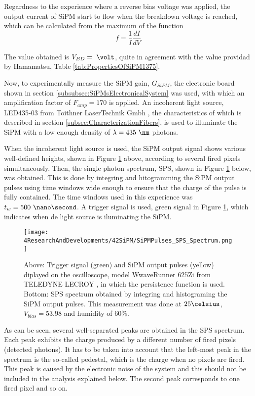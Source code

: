 Regardness to the experience where a reverse bias voltage was applied, the output current of SiPM start to flow when the breakdown voltage is reached, which can be calculated from the maximum of the function 
\begin{equation}
f=\frac{1}{I}\frac{dI}{dV}
\label{BreakDownVoltageFunction}
\end{equation}

The value obtained is $V_{BD}=~\volt$, quite in agreement with the value providad by Hamamatsu, Table \ref{tab:PropertiesOfSiPM1375}.

Now, to experimentally measure the SiPM gain, $G_{SiPM}$, the electronic board shown in section \ref{subsubsec:SiPMsElectronicalSystem} was used, with which an amplification factor of $F_{amp}=170$ is applied. An incoherent light source, LED435-03 from Toithner LaserTechnik Gmbh \cite{LEDRLT}, the characteristics of which is described in section \ref{subsec:CharacterizationFibers}, is used to illuminate the SiPM with a low enough density of $\lambda= 435~\nm$ photons.

When the incoherent light source is used, the SiPM output signal shows various well-defined heights, shown in Figure \ref{fig:OutputPulses_SPSspectrum} above, according to several fired pixels simultaneously. Then, the single photon spectrum, SPS, shown in Figure \ref{fig:OutputPulses_SPSspectrum} below, was obtained. This is done by integring and hitogramming the SiPM output pulses using time windows wide enough to ensure that the charge of the pulse is fully contained. The time windows used in this experience was $t_w= 500~\nano\second$. A trigger signal is used, green signal in Figure \ref{fig:OutputPulses_SPSspectrum}, which indicates when de light source is iluminating the SiPM.

\begin{figure}[hbtp]
\centering
\texttt{[image: 4ResearchAndDevelopments/42SiPM/SiPMPulses\_SPS\_Spectrum.png]}
\caption{Above: Trigger signal (green) and SiPM output pulses (yellow) diplayed on the oscilloscope, model WwaveRunner 625Zi from TELEDYNE LECROY \cite{OscilloscopeIFIMED}, in which the persistence function is used. Bottom: SPS spectrum obtained by integring and histograming the SiPM output pulses. This measurement was done at $25\celsius$, $V_{bias}=53.98$ and humidity of $60\%$. \label{fig:OutputPulses_SPSspectrum}}
\end{figure}

As can be seen, several well-separated peaks are obtained in the SPS spectrum. Each peak exhibits the charge produced by a different number of fired pixels (detected photons). It has to be taken into account that the left-most peak in the spectrum is the so-called pedestal, which is the charge when no pixels are fired. This peak is caused by the electronic noise of the system and this should not be included in the analysis explained below. The second peak corresponds to one fired pixel and so on.

